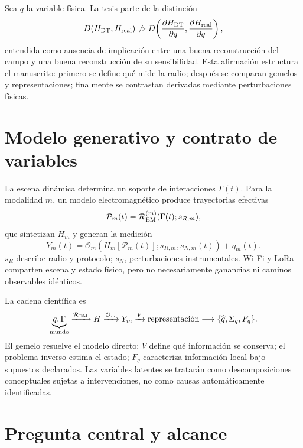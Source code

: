 Sea $q$ la variable física. La tesis parte de la distinción
\begin{equation}
D(H_{\rm DT},H_{\rm real})
\not\Rightarrow
D\!\left(\frac{\partial H_{\rm DT}}{\partial q},
\frac{\partial H_{\rm real}}{\partial q}\right),
\label{eq:intro_static_differential}
\end{equation}
entendida como ausencia de implicación entre una buena reconstrucción del campo y una buena reconstrucción de su sensibilidad. Esta afirmación estructura el manuscrito: primero se define qué mide la radio; después se comparan gemelos y representaciones; finalmente se contrastan derivadas mediante perturbaciones físicas.

\section{Modelo generativo y contrato de variables}

La escena dinámica determina un soporte de interacciones $\Gamma(t)$. Para la modalidad $m$, un modelo electromagnético produce trayectorias efectivas
\begin{equation}
\mathcal P_m(t)=\mathcal R_{\rm EM}^{(m)}(\Gamma(t);s_{R,m}),
\label{eq:radio_dependent_paths}
\end{equation}
que sintetizan $H_m$ y generan la medición
\begin{equation}
Y_m(t)=\mathcal O_m\!\left(H_m[\mathcal P_m(t)];s_{R,m},s_{N,m}(t)\right)+\eta_m(t).
\label{eq:generative_observation}
\end{equation}
$s_R$ describe radio y protocolo; $s_N$, perturbaciones instrumentales. Wi-Fi y LoRa comparten escena y estado físico, pero no necesariamente ganancias ni caminos observables idénticos.

La cadena científica es
\begin{equation}
\underbrace{q,\Gamma}_{\text{mundo}}
\xrightarrow{\mathcal R_{\rm EM}} H
\xrightarrow{\mathcal O_m}Y_m
\xrightarrow{V}\text{representación}
\longrightarrow\{\widehat q,\Sigma_q,F_q\}.
\label{eq:thesis_chain}
\end{equation}
El gemelo resuelve el modelo directo; $V$ define qué información se conserva; el problema inverso estima el estado; $F_q$ caracteriza información local bajo supuestos declarados. Las variables latentes se tratarán como descomposiciones conceptuales sujetas a intervenciones, no como causas automáticamente identificadas.

\section{Pregunta central y alcance}


